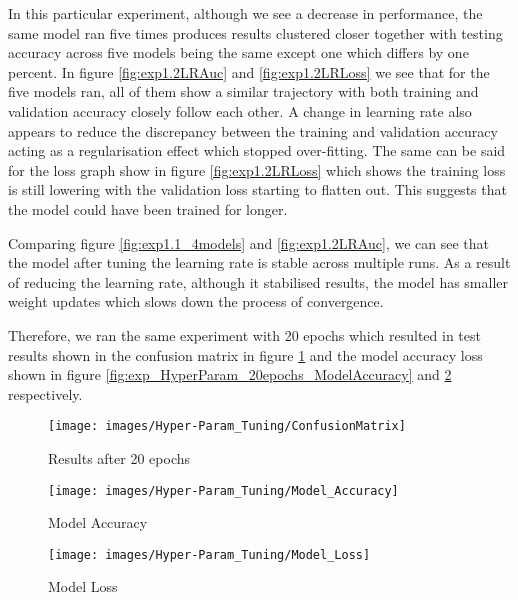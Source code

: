 In this particular experiment, although we see a decrease in performance, the same model ran five times produces results clustered closer together with testing accuracy across five models being the same except one which differs by one percent. In figure \ref{fig:exp1.2LRAuc} and \ref{fig:exp1.2LRLoss} we see that for the five models ran, all of them show a similar trajectory with both training and validation accuracy closely follow each other. A change in learning rate also appears to reduce the discrepancy between the training and validation accuracy acting as a regularisation effect which stopped over-fitting. The same can be said for the loss graph show in figure \ref{fig:exp1.2LRLoss} which shows the training loss is still lowering with the validation loss starting to flatten out. This suggests that the model could have been trained for longer. 

Comparing figure \ref{fig:exp1.1_4models} and \ref{fig:exp1.2LRAuc}, we can see that the model after tuning the learning rate is stable across multiple runs. As a result of reducing the learning rate, although it stabilised results, the model has smaller weight updates which slows down the process of convergence. 

Therefore, we ran the same experiment with 20 epochs which resulted in test results shown in the confusion matrix in figure \ref{fig:exp_HyperParam_20epochs_CM} and the model accuracy loss shown in figure \ref{fig:exp_HyperParam_20epochs_ModelAccuracy}  and \ref{fig:exp_HyperParam_20epochs_ModelLoss} respectively. 

\begin{figure}[H]
	\centering
	\hspace{-1cm}
	\texttt{[image: images/Hyper-Param\_Tuning/ConfusionMatrix]}
	\caption{Results after 20 epochs}
	\label{fig:exp_HyperParam_20epochs_CM}
\end{figure}

\begin{figure}[H]
	\begin{minipage}[t]{7.2cm}
		\begin{center}
			\texttt{[image: images/Hyper-Param\_Tuning/Model\_Accuracy]}
			\caption{Model Accuracy}
			\label{fig:exp_HyperParam_20epochs_ModelAccuracy}
		\end{center}
	\end{minipage}
	\hfill
	\begin{minipage}[t]{7.2cm}
		\begin{center}
			\texttt{[image: images/Hyper-Param\_Tuning/Model\_Loss]}
			\caption{Model Loss}
			\label{fig:exp_HyperParam_20epochs_ModelLoss}
		\end{center}
	\end{minipage}
\end{figure}

